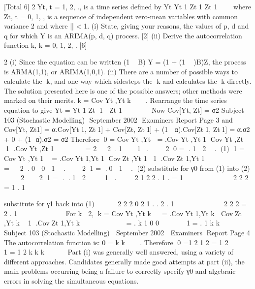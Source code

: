 \documentclass[a4paper,12pt]{article}
\begin{document}
[Total 6]
2 Yt, t = 1, 2, ., is a time series defined by
Yt Yt 1 Zt 1  Zt 1  
   
where Zt, t = 0, 1, , is a sequence of independent zero-mean variables with
common variance 2 and where || < 1.
(i) State, giving your reasons, the values of p, d and q for which Y is an
ARIMA(p, d, q) process. [2]
(ii) Derive the autocorrelation function 	k, k = 0, 1, 2, . [6]


2 (i) Since the equation can be written (1  B) Y = (1 + (1  )B)Z, the process is
ARMA(1,1), or ARIMA(1,0,1).
(ii) There are a number of possible ways to calculate the k, and one way which
sidesteps the k and calculates the k directly. The solution presented here is
one of the possible answers; other methods were marked on their merits.
k = CovYt ,Yt k    .
Rearrange the time series equation to give Yt = Yt 1 Zt 1  Zt 1      
Now Cov[Yt, Zt] = σ2
Subject 103 (Stochastic Modelling)  September 2002  Examiners Report
Page 3
and Cov[Yt, Zt1] = α.Cov[Yt1, Zt1] + Cov[Zt, Zt1] + (1  α).Cov[Zt1, Zt1]
= α.σ2 + 0 + (1  α).σ2 = σ2
Therefore
0 = CovYt ,Yt  = .CovYt ,Yt 1 CovYt ,Zt  1 .CovYt ,Zt 1      
= 2   2
.1    1 .
   2
0 = .1  2  . (1)
1 = CovYt ,Yt 1 
= .CovYt 1,Yt 1 CovZt ,Yt 1 1 .CovZt 1,Yt 1     
   
=   2
.0  0  1  .
   2
1 = .0  1  . (2)
substitute for γ0 from (1) into (2)
    2    2
1 = . .1  2     1 .

    2
1 2
2 . 1 .
=
1
         	

2
2
2
= 1 .
1
    
       	 

substitute for γ1 back into (1)

 
 
2 2
2
0 2
1 .
. 2 .
1
  
    

2
2
2
= 2 .
1
  
       	
For k  2,
k = CovYt ,Yt k  
= .CovYt 1,Yt k  CovZt ,Yt k  1 .CovZt 1,Yt k      
   
= . k 1 0 0     
 1
= . 1 k
k

  
Subject 103 (Stochastic Modelling)  September 2002  Examiners Report
Page 4
The autocorrelation function is:
0
= k
k



. Therefore
0 =1
2
1 2
= 1
2
 


1
= 1 2 k
k k     
Part (i) was generally well answered, using a variety of different approaches. Candidates
generally made good attempts at part (ii), the main problems occurring being a failure to
correctly specify γ0 and algebraic errors in solving the simultaneous equations.
\end{document}
